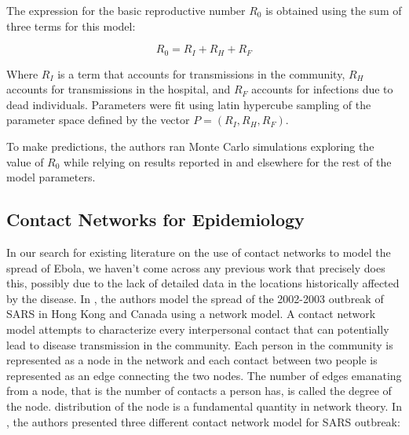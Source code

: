 \documentclass[10pt, journal,onecolumn]{IEEEtran}
\begin{document}
The expression for the basic reproductive number $R_0$ is obtained using the sum of three terms
for this model:

$$
R_0 = R_I + R_H + R_F
$$

Where $R_I$ is a term that accounts for transmissions in the community, $R_H$ accounts for
transmissions in the hospital, and $R_F$ accounts for infections due to dead individuals.
Parameters were fit using latin hypercube sampling of the parameter space defined by the
vector $P = (R_I, R_H, R_F)$.

To make predictions, the authors ran Monte Carlo simulations exploring the value of $R_0$ while relying on results reported
in \citep{legrand2007understanding} and elsewhere for the rest of the model parameters.



\subsection{\textbf{Contact Networks for Epidemiology \citep{meyers2005network}}}
In our search for existing literature on the use of contact networks to model the spread of Ebola, we haven't come
across any previous work that precisely does this, possibly due to the lack of detailed data in the
locations historically affected by the disease.
In \citep{meyers2005network}, the authors model the spread of the 2002-2003
outbreak of SARS in Hong Kong and Canada using a network model. A contact network model attempts to
characterize every interpersonal contact that can potentially lead to disease transmission in the
community. Each person in the community is represented as a node in the network and each contact between
two people is represented as an edge connecting the two nodes. The number of edges emanating from a node,
that is the number of contacts a person has, is called the degree of the node.
distribution of the node is a fundamental quantity in network theory. In
\citep{meyers2005network}, the authors presented three different contact network model for SARS
outbreak:
\end{document}
